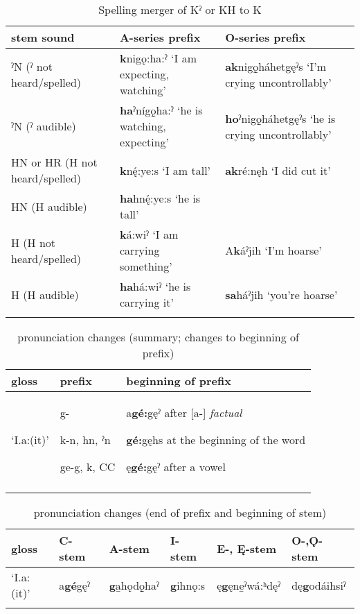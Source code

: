 \begin{table}
\caption{Spelling merger of Kˀ or KH to K}
\label{tab:1:splmrgk}
\scriptsize{
\begin{tabularx}{\textwidth}{XXX}
\lsptoprule
stem sound & A-series prefix & O-series prefix\\
\midrule
ˀN (ˀ not heard/spelled) & \textbf{k}nigǫ:ha:ˀ ‘I am expecting, watching’ & \textbf{ak}nigǫ̱háhetgęˀs ‘I’m crying uncontrollably’\\
{}ˀN (ˀ audible) & \textbf{ha}ˀnígǫ̱ha:ˀ ‘he is watching, expecting’ & \textbf{ho}ˀnigǫ̱háhetgęˀs ‘he is crying uncontrollably’\\
HN or HR (H not heard/spelled) & \textbf{k}n\'{ę}:ye:s ‘I am tall’ & \textbf{ak}ré:nęh ‘I did cut it’\\
HN (H audible) & \textbf{ha}hn\'{ę}:ye:s ‘he is tall’ & \\
H (H not heard/spelled) & \textbf{k}á:wiˀ ‘I am carrying something’ & A\textbf{k}áˀjih ‘I’m hoarse’\\
H (H audible) & \textbf{ha}há:wiˀ ‘he is carrying it’ & \textbf{sa}háˀjih ‘you’re hoarse’\\
\lspbottomrule
\end{tabularx}}
\end{table}


\begin{table}
\caption{pronunciation changes (summary; changes to beginning of prefix)}
\label{tab:1:prontblfst}
\scriptsize{
\begin{tabularx}{\textwidth}{XXX}
\lsptoprule
gloss & prefix & beginning of prefix\\
\midrule
‘I.a:(it)’ & 

g-

k-n, hn, ˀn

ge-g, k, CC & a\textbf{gé:}gęˀ after [a-] \textit{factual}

\textbf{gé:}gęhs at the beginning of the word

ę\textbf{gé:}gęˀ after a vowel\\
\lspbottomrule
\end{tabularx}}
\end{table}


\begin{table}
\caption{pronunciation changes (end of prefix and beginning of stem)}
\label{tab:1:secondprontable}
\scriptsize{
\begin{tabularx}{\textwidth}{XXXXXX} 
\lsptoprule
gloss & C-stem & A-stem & I-stem & E-, Ę{}-stem & O-,Ǫ{}-stem\\
\midrule
‘I.a:(it)’ & a\textbf{gé}gęˀ & \textbf{g}a̱hǫdǫ̱haˀ & \textbf{g}ihnǫ:s & ę\textbf{g}ęne̱ˀwá:ʰdęˀ & dę\textbf{g}odáihsiˀ\\
\lspbottomrule
\end{tabularx}}
\end{table}
